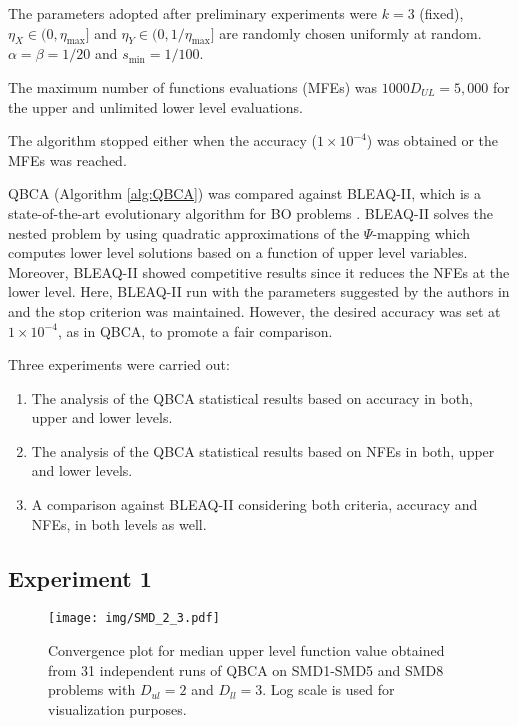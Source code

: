 \documentclass[conference]{IEEEtran}
\theoremstyle{definition}
\begin{document}
The parameters adopted after preliminary
experiments were $k = 3$ (fixed), $\eta_{X} \in (0, \eta_{\max}]$ and $\eta_{Y} \in (0, 1/\eta_{\max}]$ are randomly chosen uniformly at random.
$\alpha = \beta = 1 / 20$ and $s_{\min} = 1/100$. 

% 
The maximum number of functions evaluations (MFEs) was $1000D_{UL}=5,000$ for the
upper and unlimited lower level evaluations.
% 

The  algorithm stopped either
when the accuracy ($1\times 10^{-4}$) was obtained or the MFEs was reached.

% 
QBCA (Algorithm \ref{alg:QBCA}) was compared against BLEAQ-II, which is a state-of-the-art
evolutionary algorithm for BO problems \cite{sinha2018review,sinha2013efficient}.
BLEAQ-II solves the nested problem by using quadratic approximations of the
$\Psi$-mapping which computes lower level solutions based on a function of upper
level variables. Moreover, BLEAQ-II showed competitive results since it reduces
the NFEs at the lower level. Here, BLEAQ-II run with the parameters suggested by
the authors in \cite{sinha2018review,sinha2017bilevel} and the stop criterion was
maintained.  However, the desired accuracy was set at $1\times 10^{-4}$, as in
QBCA, to promote a fair comparison.

Three experiments were carried out:
% 
\begin{enumerate}
    \item The analysis of the QBCA statistical results based on accuracy in both,
          upper and lower levels.
    \item The analysis of the QBCA statistical results based on NFEs in both,
          upper and lower levels. 
    \item A comparison against BLEAQ-II considering both criteria, accuracy and
          NFEs, in both levels as well.
\end{enumerate}
% 


\subsection{Experiment 1}

\begin{figure*}[t]
    \centering
    \texttt{[image: img/SMD\_2\_3.pdf]}
    \caption{Convergence plot for median upper level function value obtained from 31 independent runs of QBCA on SMD1-SMD5 and SMD8 problems with $D_{ul} = 2 $ and $ D_{ll} = 3$. Log scale is used for visualization purposes.}
\end{figure*}
\end{document}
